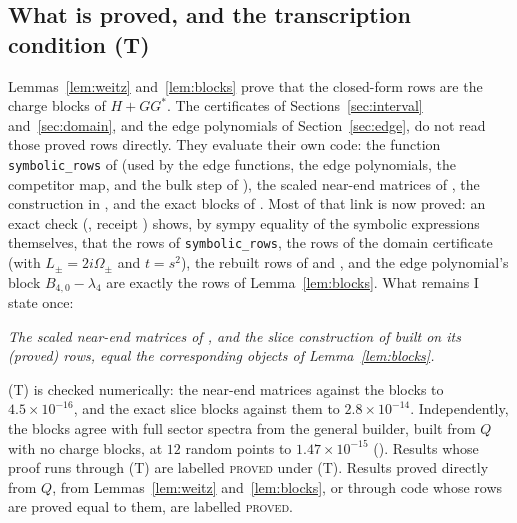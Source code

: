 \documentclass[11pt]{article}
\theoremstyle{definition}
\theoremstyle{remark}
\newcommand{\PROVED}{\textsc{proved}}
\newcommand{\PROVEDT}{\textsc{proved} under (T)}
\begin{document}
\subsection{What is proved, and the transcription condition (T)}\label{subsec:standing}

Lemmas~\ref{lem:weitz} and~\ref{lem:blocks} prove that the closed-form rows are the charge blocks of $H+GG^*$. The
certificates of Sections~\ref{sec:interval} and~\ref{sec:domain}, and the edge polynomials of Section~\ref{sec:edge},
do not read those proved rows directly. They evaluate their own code: the function \texttt{symbolic\_rows} of
 (used by the edge functions, the edge polynomials, the competitor map,
 and the bulk step of ), the scaled near-end matrices
of , the construction in , and the exact blocks of
. Most of that link is now proved: an exact check
(, receipt )
shows, by sympy equality of the symbolic expressions themselves, that the rows of \texttt{symbolic\_rows}, the rows of the
domain certificate (with $L_\pm=2i\Omega_\pm$ and $t=s^2$), the rebuilt rows of  and
, and the edge polynomial's block $B_{4,0}-\lambda_4$ are exactly the rows of
Lemma~\ref{lem:blocks}. What remains I state once:
\begin{description}[leftmargin=2.2em]
  \item[(T)] \emph{The scaled near-end matrices of , and the slice construction of
   built on its (proved) rows, equal the corresponding objects of Lemma~\ref{lem:blocks}.}
\end{description}
(T) is checked numerically: the near-end matrices against the blocks to $4.5\times10^{-16}$, and the exact slice blocks
against them to $2.8\times10^{-14}$. Independently, the blocks agree with full sector spectra from the general builder,
built from $Q$ with no charge blocks, at $12$ random points to $1.47\times10^{-15}$
(). Results whose proof runs through (T) are labelled \PROVEDT.
Results proved directly from $Q$, from Lemmas~\ref{lem:weitz} and~\ref{lem:blocks}, or through code whose rows are proved
equal to them, are labelled \PROVED.
\end{document}
